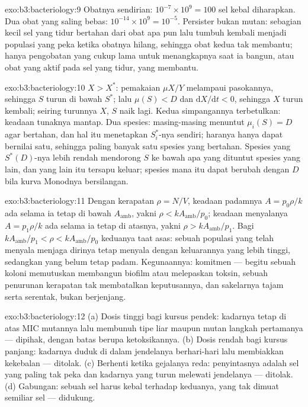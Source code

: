 \begin{solution}{exo:b3:bacteriology:9}
Obatnya sendirian: $10^{-7}\times 10^{9} = 100$ sel kebal diharapkan. Dua
obat yang saling bebas: $10^{-14}\times 10^{9} = 10^{-5}$. Persister bukan
mutan: sebagian kecil sel yang tidur bertahan dari obat apa pun lalu tumbuh
kembali menjadi populasi yang peka ketika obatnya hilang, sehingga obat kedua
tak membantu; hanya pengobatan yang cukup lama untuk menangkapnya saat ia
bangun, atau obat yang aktif pada sel yang tidur, yang membantu.
\end{solution}

\begin{solution}{exo:b3:bacteriology:10}
$X > X^{*}$: pemakaian $\mu X/Y$ melampaui pasokannya, sehingga $S$ turun di
bawah $S^{*}$; lalu $\mu(S) < D$ dan $\mathrm{d}X/\mathrm{d}t < 0$, sehingga
$X$ turun kembali; seiring turunnya $X$, $S$ naik lagi. Kedua simpangannya
terbetulkan: keadaan tunaknya mantap. Dua spesies: masing-masing menuntut
$\mu_{i}(S) = D$ agar bertahan, dan hal itu menetapkan $S_{i}^{*}$-nya sendiri;
haranya hanya dapat bernilai satu, sehingga paling banyak satu spesies yang
bertahan. Spesies yang $S^{*}(D)$-nya lebih rendah mendorong $S$ ke bawah apa
yang dituntut spesies yang lain, dan yang lain itu tersapu keluar; spesies mana
itu dapat berubah dengan $D$ bila kurva Monodnya bersilangan.
\end{solution}

\begin{solution}{exo:b3:bacteriology:11}
Dengan kerapatan $\rho = N/V$, keadaan padamnya $A = p_{0}\rho/k$ ada selama
ia tetap di bawah $A_{\text{amb}}$, yakni $\rho < kA_{\text{amb}}/p_{0}$;
keadaan menyalanya $A = p_{1}\rho/k$ ada selama ia tetap di atasnya, yakni $\rho
> kA_{\text{amb}}/p_{1}$. Bagi $kA_{\text{amb}}/p_{1} < \rho <
kA_{\text{amb}}/p_{0}$ keduanya taat asas: sebuah populasi yang telah
menyala menjaga dirinya tetap menyala dengan keluarannya yang lebih tinggi,
sedangkan yang belum tetap padam. Kegunaannya: komitmen --- begitu sebuah
koloni memutuskan membangun biofilm atau melepaskan toksin, sebuah penurunan
kerapatan tak membatalkan keputusannya, dan sakelarnya tajam serta serentak,
bukan berjenjang.
\end{solution}

\begin{solution}{exo:b3:bacteriology:12}
(a) Dosis tinggi bagi kursus pendek: kadarnya tetap di atas MIC mutannya lalu
membunuh tipe liar maupun mutan langkah pertamanya --- dipihak, dengan batas
berupa ketoksikannya. (b) Dosis rendah bagi kursus panjang: kadarnya duduk di
dalam jendelanya berhari-hari lalu membiakkan kekebalan --- ditolak. (c)
Berhenti ketika gejalanya reda: penyintasnya adalah sel yang paling tak peka
dan kadarnya yang turun melewati jendelanya --- ditolak. (d) Gabungan:
sebuah sel harus kebal terhadap keduanya, yang tak dimuat semiliar sel
--- didukung.
\end{solution}


